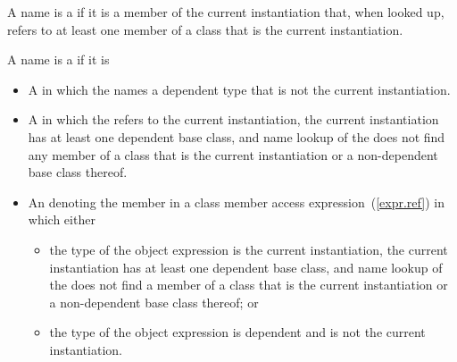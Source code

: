%
A name is a  if it is a
member of the current instantiation that, when looked up, refers to at least
one member of a class that is the current instantiation.

\pnum
A name is a
if it is

\begin{itemize}
\item
A
in which the
names a dependent type that is not the current instantiation.

\item A  in which the 
refers to the current instantiation, the current instantiation has at least one
dependent base class, and name lookup of the  does not
find any member of a class that is the current instantiation or a non-dependent
base class thereof.

\item An  denoting the member in a class member access
expression~(\ref{expr.ref}) in which either
\begin{itemize}
\item the type of the object expression is the current instantiation, the
current instantiation has at least one dependent base class, and name lookup
of the  does not find a member of a class that is
the current instantiation or a non-dependent base class thereof; or

\item the type of the object expression is dependent and is not the current
instantiation.
\end{itemize}
\end{itemize}

